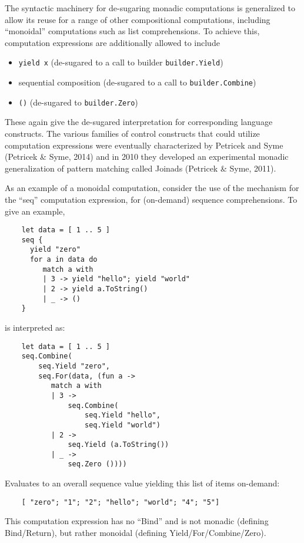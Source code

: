 \documentclass[acmsmall,review]{acmart}\settopmatter{printfolios=true,printccs=false,printacmref=false}
\begin{document}
The syntactic machinery for de-sugaring monadic computations is generalized to allow its reuse for a range of other compositional computations, including “monoidal” computations such as list comprehensions. To achieve this, computation expressions are additionally allowed to include 

\begin{itemize}
\item \texttt{yield x} (de-sugared to a call to builder \texttt{builder.Yield})
\item sequential composition (de-sugared to a call to \texttt{builder.Combine}) 
\item \texttt{()} (de-sugared to \texttt{builder.Zero}) 
\end{itemize}
These again give the de-sugared interpretation for corresponding language constructs.  The various families of control constructs that could utilize computation expressions were eventually characterized by Petricek and Syme (Petricek \& Syme, 2014) and in 2010 they developed an experimental monadic generalization of pattern matching called Joinads (Petricek \& Syme, 2011).

As an example of a monoidal computation, consider the use of the mechanism for the “seq” computation expression, for (on-demand) sequence comprehensions.  To give an example, 

\begin{verbatim}
    let data = [ 1 .. 5 ]
    seq {
      yield "zero"
      for a in data do
         match a with
         | 3 -> yield "hello"; yield "world"
         | 2 -> yield a.ToString() 
         | _ -> () 
    }
\end{verbatim}
is interpreted as:
\begin{verbatim}
    let data = [ 1 .. 5 ]
    seq.Combine(
        seq.Yield "zero",
        seq.For(data, (fun a ->
           match a with
           | 3 -> 
               seq.Combine(
                   seq.Yield "hello", 
                   seq.Yield "world")
           | 2 ->
               seq.Yield (a.ToString())
           | _ ->
               seq.Zero ())))
\end{verbatim}
Evaluates to an overall sequence value yielding this list of items on-demand:
\begin{verbatim}
    [ "zero"; "1"; "2"; "hello"; "world"; "4"; "5"] 
\end{verbatim}
This computation expression has no “Bind” and is not monadic (defining Bind/Return), but rather monoidal (defining Yield/For/Combine/Zero).  
\end{document}
